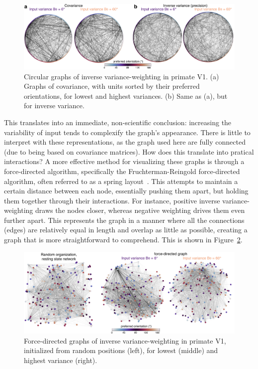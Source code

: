 \begin{figure}[h!tbp]
\vspace{0.1cm}
\centering
\includegraphics[width=1.\textwidth]{fig/chap5_circ_graphs.pdf}
\caption[Circular graphs of inverse variance.]{Circular graphs of inverse variance-weighting in primate \gls{V1}. (a) Graphs of covariance, with units sorted by their preferred orientations, for lowest and highest variances. (b) Same as (a), but for inverse variance.}
\label{fig_chap5_circ_graphs} 
\end{figure} 

This translates into an immediate, non-scientific conclusion: increasing the variability of input tends to complexify the graph's appearance. There is little to interpret with these representations, as the graph used here are fully connected (due to being based on covariance matrices).
How does this translate into pratical interactions? A more effective method for visualizing these graphs is through a force-directed algorithm, specifically the Fruchterman-Reingold force-directed algorithm, often referred to as a spring layout~\cite{fruchterman1991graph}. This attempts to maintain a certain distance between each node, essentially pushing them apart, but holding them together through their interactions. For instance, positive inverse variance-weighting draws the nodes closer, whereas negative weighting drives them even further apart. This represents the graph in a manner where all the connections (edges) are relatively equal in length and overlap as little as possible, creating a graph that is more straightforward to comprehend. This is shown in Figure~\ref{fig_chap5_force_graphs}.

\begin{figure}[h!tbp]
\vspace{0.1cm}
\centering
\includegraphics[width=1.\textwidth]{fig/chap5_force_graphs.pdf}
\caption[Force-directed graphs of inverse variance.]{Force-directed graphs of inverse variance-weighting in primate \gls{V1}, initialized from random positions (left), for lowest (middle) and highest variance (right).}
\label{fig_chap5_force_graphs} 
\end{figure} 

